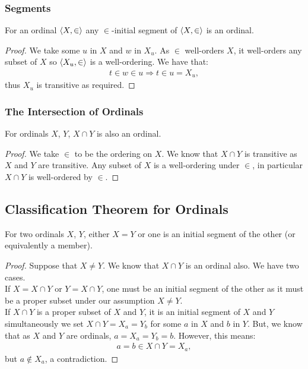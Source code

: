 \subsubsection{Segments}

For an ordinal $\langle X, \in \rangle$ any $\in$-initial segment of 
$\langle X, \in \rangle$ is an ordinal.

\begin{proof}
    We take some $u$ in $X$ and $w$ in $X_u$. 
    As $\in$ well-orders $X$, it well-orders
    any subset of $X$ so $\langle X_u, \in \rangle$ is a well-ordering. 
    We have that: \begin{align*}
        t \in w \in u \Longrightarrow t \in u = X_u,
    \end{align*} thus $X_u$ is transitive as required.
\end{proof}

\subsubsection{The Intersection of Ordinals}

For ordinals $X$, $Y$, $X \cap Y$ is also an ordinal.

\begin{proof}
    We take $\in$ to be the ordering on $X$.
    We know that $X \cap Y$ is transitive as $X$ and $Y$
    are transitive. Any subset of $X$ is a well-ordering
    under $\in$, in particular $X \cap Y$
    is well-ordered by $\in$. 
\end{proof}

\subsection{Classification Theorem for Ordinals}

For two ordinals $X$, $Y$, either $X = Y$ or one is an initial
segment of the other (or equivalently a member).

\begin{proof}
    Suppose that $X \neq Y$. We know that $X \cap Y$ is an ordinal
    also. We have two cases.
    \\[\baselineskip]
    If $X = X \cap Y$ or $Y = X \cap Y$, one must
    be an initial segment of the other as it must
    be a proper subset under our assumption $X \neq Y$.
    \\[\baselineskip]
    If $X \cap Y$ is a proper subset of $X$ and $Y$,
    it is an initial segment of $X$ and $Y$ simultaneously
    we set $X \cap Y = X_a = Y_b$ for some $a$ in $X$ and
    $b$ in $Y$. But, we know that as $X$ and $Y$ are ordinals,
    $a = X_a = Y_b = b$. However, this means: \begin{align*}
        a = b \in X \cap Y = X_a,
    \end{align*} but $a \notin X_a$, a contradiction.
\end{proof}

